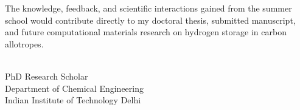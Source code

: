 \documentclass[11pt,a4paper]{article}
\begin{document}
The knowledge, feedback, and scientific interactions gained from the summer school would contribute directly to my doctoral thesis, submitted manuscript, and future computational materials research on hydrogen storage in carbon allotropes.

\vfill

\\
PhD Research Scholar\\
Department of Chemical Engineering\\
Indian Institute of Technology Delhi
\end{document}
